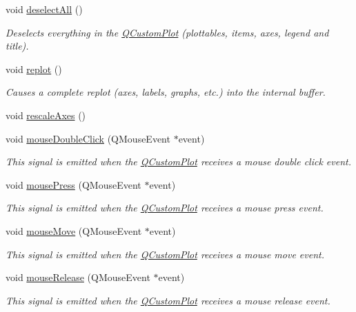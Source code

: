 \begin{DoxyCompactItemize}
void \hyperlink{a00116_a9d4808ab925b003054085246c92a257c}{deselect\+All} ()
\begin{DoxyCompactList}\small\item\em Deselects everything in the \hyperlink{a00030_d8/d00/a00186}{Q\+Custom\+Plot} (plottables, items, axes, legend and title). \end{DoxyCompactList}\item 
void \hyperlink{a00116_a563540b54b2a09c8ef092d42e9621f42}{replot} ()
\begin{DoxyCompactList}\small\item\em Causes a complete replot (axes, labels, graphs, etc.) into the internal buffer. \end{DoxyCompactList}\item 
void \hyperlink{a00116_a098c37f4447cbea48764873689ba1695}{rescale\+Axes} ()
\item 
void \hyperlink{a00116_a9b232142c64fcf273a953ee08e5b90e9}{mouse\+Double\+Click} (Q\+Mouse\+Event $\ast$event)
\begin{DoxyCompactList}\small\item\em This signal is emitted when the \hyperlink{a00030_d8/d00/a00186}{Q\+Custom\+Plot} receives a mouse double click event. \end{DoxyCompactList}\item 
void \hyperlink{a00116_aca75bf9afb5dd19349c375de2a87a051}{mouse\+Press} (Q\+Mouse\+Event $\ast$event)
\begin{DoxyCompactList}\small\item\em This signal is emitted when the \hyperlink{a00030_d8/d00/a00186}{Q\+Custom\+Plot} receives a mouse press event. \end{DoxyCompactList}\item 
void \hyperlink{a00116_a742ca4f94688bed2a685fd8a56ce5704}{mouse\+Move} (Q\+Mouse\+Event $\ast$event)
\begin{DoxyCompactList}\small\item\em This signal is emitted when the \hyperlink{a00030_d8/d00/a00186}{Q\+Custom\+Plot} receives a mouse move event. \end{DoxyCompactList}\item 
void \hyperlink{a00116_ac8dc0ee6bb98e923c00b4ebafbe6134d}{mouse\+Release} (Q\+Mouse\+Event $\ast$event)
\begin{DoxyCompactList}\small\item\em This signal is emitted when the \hyperlink{a00030_d8/d00/a00186}{Q\+Custom\+Plot} receives a mouse release event. \end{DoxyCompactList}\item 

\end{DoxyCompactItemize}
